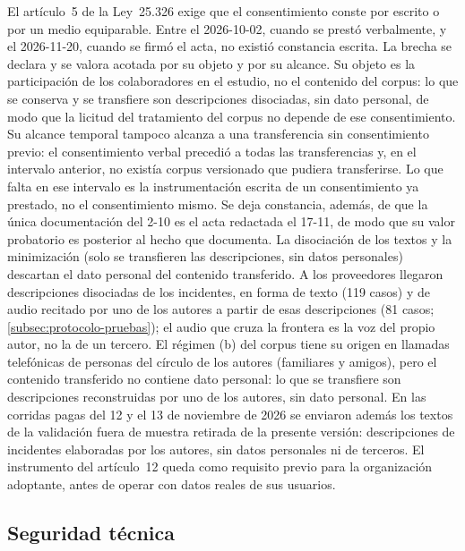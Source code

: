 El artículo~5 de la Ley~25.326 exige que el consentimiento conste por escrito o por un medio equiparable. Entre el 2026-10-02, cuando se prestó verbalmente, y el 2026-11-20, cuando se firmó el acta, no existió constancia escrita. La brecha se declara y se valora acotada por su objeto y por su alcance. Su objeto es la participación de los colaboradores en el estudio, no el contenido del corpus: lo que se conserva y se transfiere son descripciones disociadas, sin dato personal, de modo que la licitud del tratamiento del corpus no depende de ese consentimiento. Su alcance temporal tampoco alcanza a una transferencia sin consentimiento previo: el consentimiento verbal precedió a todas las transferencias y, en el intervalo anterior, no existía corpus versionado que pudiera transferirse. Lo que falta en ese intervalo es la instrumentación escrita de un consentimiento ya prestado, no el consentimiento mismo. Se deja constancia, además, de que la única documentación del 2-10 es el acta redactada el 17-11, de modo que su valor probatorio es posterior al hecho que documenta. La disociación de los textos y la minimización (solo se transfieren las descripciones, sin datos personales) descartan el dato personal del contenido transferido. A los proveedores llegaron descripciones disociadas de los incidentes, en forma de texto (119 casos) y de audio recitado por uno de los autores a partir de esas descripciones (81 casos; \autoref{subsec:protocolo-pruebas}); el audio que cruza la frontera es la voz del propio autor, no la de un tercero. El régimen (b) del corpus tiene su origen en llamadas telefónicas de personas del círculo de los autores (familiares y amigos), pero el contenido transferido no contiene dato personal: lo que se transfiere son descripciones reconstruidas por uno de los autores, sin dato personal. En las corridas pagas del 12 y el 13 de noviembre de 2026 se enviaron además los textos de la validación fuera de muestra retirada de la presente versión: descripciones de incidentes elaboradas por los autores, sin datos personales ni de terceros. El instrumento del artículo~12 queda como requisito previo para la organización adoptante, antes de operar con datos reales de sus usuarios.

\subsection{Seguridad técnica}\label{subsec:seguridad-tecnica}

